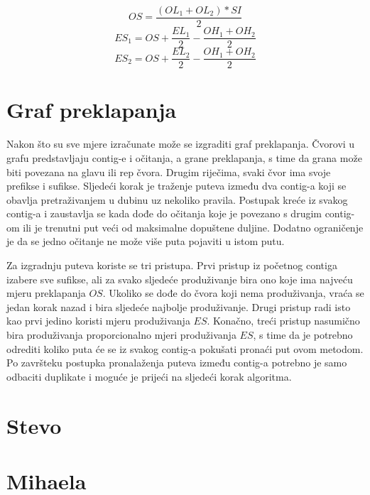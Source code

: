 \begin{equation}
OS = \frac{(OL_1 + OL_2) * SI}{2}
\label{eq:os}
\end{equation}
\begin{equation}
ES_1 = OS + \frac{EL_1}{2} - \frac{OH_1 + OH_2}{2}
\label{eq:es1}
\end{equation}
\begin{equation}
ES_2 = OS + \frac{EL_2}{2} - \frac{OH_1 + OH_2}{2}
\label{eq:es2}
\end{equation}

\section{Graf preklapanja}
Nakon što su sve mjere izračunate može se izgraditi graf preklapanja. Čvorovi u grafu predstavljaju contig-e i očitanja, a grane preklapanja, s time da grana može biti povezana na glavu ili rep čvora. Drugim riječima, svaki čvor ima svoje prefikse i sufikse. Sljedeći korak je traženje puteva između dva contig-a koji se obavlja pretraživanjem u dubinu  uz nekoliko pravila. Postupak kreće iz svakog contig-a i zaustavlja se kada dođe do očitanja koje je povezano s drugim contig-om ili je trenutni put veći od maksimalne dopuštene duljine. Dodatno ograničenje je da se jedno očitanje ne može više puta pojaviti u istom putu.

Za izgradnju puteva koriste se tri pristupa. Prvi pristup iz početnog contiga izabere sve sufikse, ali za svako sljedeće produživanje bira ono koje ima najveću mjeru preklapanja $OS$. Ukoliko se dođe do čvora koji nema produživanja, vraća se jedan korak nazad i bira sljedeće najbolje produživanje. Drugi pristup radi isto kao prvi jedino koristi mjeru produživanja $ES$. Konačno, treći pristup nasumično bira produživanja proporcionalno mjeri produživanja $ES$, s time da je potrebno odrediti koliko puta će se iz svakog contig-a pokušati pronaći put ovom metodom. Po završteku postupka pronalaženja puteva između contig-a potrebno je samo odbaciti duplikate i moguće je prijeći na sljedeći korak algoritma.

\section{Stevo}

\section{Mihaela}